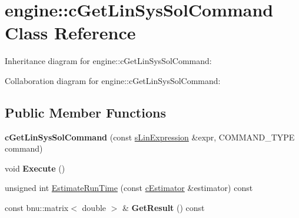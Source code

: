 \hypertarget{classengine_1_1cGetLinSysSolCommand}{\section{engine\-:\-:c\-Get\-Lin\-Sys\-Sol\-Command Class Reference}
\label{classengine_1_1cGetLinSysSolCommand}
}


Inheritance diagram for engine\-:\-:c\-Get\-Lin\-Sys\-Sol\-Command\-:


Collaboration diagram for engine\-:\-:c\-Get\-Lin\-Sys\-Sol\-Command\-:
\subsection*{Public Member Functions}
\begin{DoxyCompactItemize}
\item 
\hypertarget{classengine_1_1cGetLinSysSolCommand_ae3baefd62a4b417f86966b4e15c44271}{{\bfseries c\-Get\-Lin\-Sys\-Sol\-Command} (const \hyperlink{structengine_1_1sLinExpression}{s\-Lin\-Expression} \&expr, C\-O\-M\-M\-A\-N\-D\-\_\-\-T\-Y\-P\-E command)}\label{classengine_1_1cGetLinSysSolCommand_ae3baefd62a4b417f86966b4e15c44271}

\item 
\hypertarget{classengine_1_1cGetLinSysSolCommand_ab32459edc5b8caa48b73f5a35d7aa4a0}{void {\bfseries Execute} ()}\label{classengine_1_1cGetLinSysSolCommand_ab32459edc5b8caa48b73f5a35d7aa4a0}

\item 
unsigned int \hyperlink{classengine_1_1cGetLinSysSolCommand_a0307c18a7b86758e315e4c69c0b94a81}{Estimate\-Run\-Time} (const \hyperlink{classengine_1_1cEstimator}{c\-Estimator} \&estimator) const 
\item 
\hypertarget{classengine_1_1cGetLinSysSolCommand_a619ded75ac61ea1e0c4a7ad7688e7466}{const bnu\-::matrix$<$ double $>$ \& {\bfseries Get\-Result} () const }\label{classengine_1_1cGetLinSysSolCommand_a619ded75ac61ea1e0c4a7ad7688e7466}

\end{DoxyCompactItemize}

